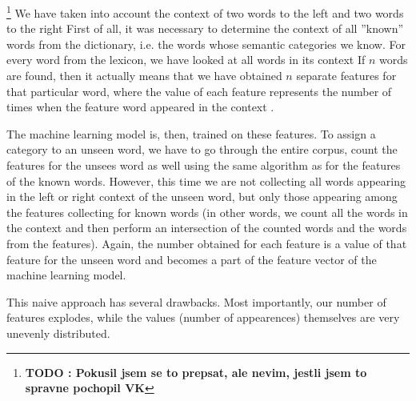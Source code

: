 \documentclass[letterpaper]{article}
\newcommand{\todofn}[1] {
 \footnote{\textbf{TODO : #1}}}
\begin{document}
\todofn{Pokusil jsem se to prepsat, ale nevim, jestli jsem to spravne pochopil VK}
We have taken into account the context of two words to the left and two words to the right 
First of all, it was necessary to determine the context of all ''known'' words from the dictionary, i.e. the words whose semantic categories we know.  
For every word from the lexicon, we 
have looked at all words in its context
If $n$ words are found, then it actually means that we have obtained $n$ separate 
features for that particular word, where the value of each feature represents 
the number of times when the feature word appeared in the context
.
 
The machine learning model is, then, trained on these features. To assign a category
to an unseen word, we have to go through the entire corpus, count
the features for the unsees word as well using the same algorithm as for the features of the known words. However, this time we are not collecting all words appearing in the left or right context of the unseen word, but only those appearing among the features collecting for known words (in other words, we count all the words in the context and then perform an 
intersection of the counted words and the words from the features). Again, the number obtained for each feature is a value of that feature for the unseen word and becomes a part of the feature vector of the machine learning model.

This naive approach has several drawbacks. Most importantly, our number of features explodes, while the values (number of appearences) themselves are very unevenly distributed.
\end{document}
